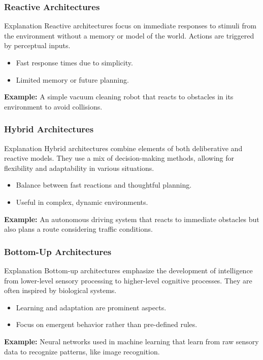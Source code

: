 \documentclass[aspectratio=169]{beamer}
\begin{document}
\begin{frame}[fragile]
  \frametitle{Reactive Architectures}
  \begin{block}{Explanation}
    Reactive architectures focus on immediate responses to stimuli from the environment without a memory or model of the world. Actions are triggered by perceptual inputs.
  \end{block}
  \begin{itemize}
    \item Fast response times due to simplicity.
    \item Limited memory or future planning.
  \end{itemize}
  \textbf{Example:} A simple vacuum cleaning robot that reacts to obstacles in its environment to avoid collisions.
\end{frame}

\begin{frame}[fragile]
  \frametitle{Hybrid Architectures}
  \begin{block}{Explanation}
    Hybrid architectures combine elements of both deliberative and reactive models. They use a mix of decision-making methods, allowing for flexibility and adaptability in various situations.
  \end{block}
  \begin{itemize}
    \item Balance between fast reactions and thoughtful planning.
    \item Useful in complex, dynamic environments.
  \end{itemize}
  \textbf{Example:} An autonomous driving system that reacts to immediate obstacles but also plans a route considering traffic conditions.
\end{frame}

\begin{frame}[fragile]
  \frametitle{Bottom-Up Architectures}
  \begin{block}{Explanation}
    Bottom-up architectures emphasize the development of intelligence from lower-level sensory processing to higher-level cognitive processes. They are often inspired by biological systems.
  \end{block}
  \begin{itemize}
    \item Learning and adaptation are prominent aspects.
    \item Focus on emergent behavior rather than pre-defined rules.
  \end{itemize}
  \textbf{Example:} Neural networks used in machine learning that learn from raw sensory data to recognize patterns, like image recognition.
\end{frame}
\end{document}
